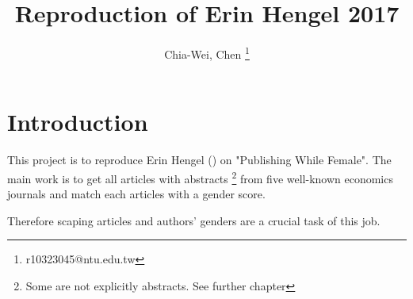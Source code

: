 \documentclass[12pt, a4paper, hidelinks]{article}
\title{Reproduction of Erin Hengel 2017}
\author{Chia-Wei, Chen \thanks{r10323045@ntu.edu.tw}}
\begin{document}
\maketitle

\tableofcontents

\section*{Introduction}
This project is to reproduce Erin Hengel (\citeyear{Hengel17}) on "Publishing While  Female". The main work is to get all articles with abstracts
\footnote{Some are not explicitly abstracts. See further chapter} 
from five well-known economics journals and match each articles with a gender score.

Therefore scaping articles and authors' genders are a crucial task of this job.
\newpage





\end{document}
